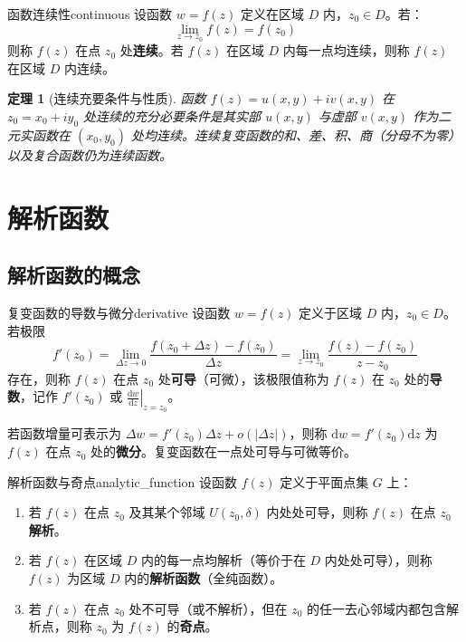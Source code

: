\documentclass[11pt,a4paper,fontset=fandol]{ctexart}
\newtheorem{theorem}{定理}[section]
\theoremstyle{remark}
\begin{document}
\begin{definition}{函数连续性}{continuous}
设函数 $w = f(z)$ 定义在区域 $D$ 内，$z_0 \in D$。若：
\begin{equation}
    \lim_{z \to z_0} f(z) = f(z_0)
\end{equation}
则称 $f(z)$ 在点 $z_0$ 处\textbf{连续}。若 $f(z)$ 在区域 $D$ 内每一点均连续，则称 $f(z)$ 在区域 $D$ 内连续。
\end{definition}

\begin{theorem}[连续充要条件与性质]
函数 $f(z) = u(x, y) + i v(x, y)$ 在 $z_0 = x_0 + iy_0$ 处连续的充分必要条件是其实部 $u(x, y)$ 与虚部 $v(x, y)$ 作为二元实函数在 $(x_0, y_0)$ 处均连续。连续复变函数的和、差、积、商（分母不为零）以及复合函数仍为连续函数。
\end{theorem}

\section{解析函数}

\subsection{解析函数的概念}

\begin{definition}{复变函数的导数与微分}{derivative}
设函数 $w = f(z)$ 定义于区域 $D$ 内，$z_0 \in D$。若极限
\begin{equation}
    f'(z_0) = \lim_{\Delta z \to 0} \frac{f(z_0 + \Delta z) - f(z_0)}{\Delta z} = \lim_{z \to z_0} \frac{f(z) - f(z_0)}{z - z_0}
\end{equation}
存在，则称 $f(z)$ 在点 $z_0$ 处\textbf{可导}（可微），该极限值称为 $f(z)$ 在 $z_0$ 处的\textbf{导数}，记作 $f'(z_0)$ 或 $\left.\frac{\mathrm{d}w}{\mathrm{d}z}\right|_{z = z_0}$。

若函数增量可表示为 $\Delta w = f'(z_0)\Delta z + o(|\Delta z|)$，则称 $\mathrm{d}w = f'(z_0)\mathrm{d}z$ 为 $f(z)$ 在点 $z_0$ 处的\textbf{微分}。复变函数在一点处可导与可微等价。
\end{definition}

\begin{definition}{解析函数与奇点}{analytic_function}
设函数 $f(z)$ 定义于平面点集 $G$ 上：
\begin{enumerate}
    \item 若 $f(z)$ 在点 $z_0$ 及其某个邻域 $U(z_0, \delta)$ 内处处可导，则称 $f(z)$ 在点 $z_0$ \textbf{解析}。
    \item 若 $f(z)$ 在区域 $D$ 内的每一点均解析（等价于在 $D$ 内处处可导），则称 $f(z)$ 为区域 $D$ 内的\textbf{解析函数}（全纯函数）。
    \item 若 $f(z)$ 在点 $z_0$ 处不可导（或不解析），但在 $z_0$ 的任一去心邻域内都包含解析点，则称 $z_0$ 为 $f(z)$ 的\textbf{奇点}。
\end{enumerate}
\end{definition}
\end{document}
